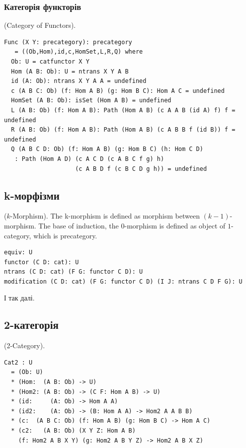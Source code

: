 \begin{definition}
\subsubsection{Категорія функторів}
\begin{definition} (Category of Functors).
\begin{lstlisting}
Func (X Y: precategory): precategory
   = ((Ob,Hom),id,c,HomSet,L,R,Q) where
  Ob: U = catfunctor X Y
  Hom (A B: Ob): U = ntrans X Y A B
  id (A: Ob): ntrans X Y A A = undefined
  c (A B C: Ob) (f: Hom A B) (g: Hom B C): Hom A C = undefined
  HomSet (A B: Ob): isSet (Hom A B) = undefined
  L (A B: Ob) (f: Hom A B): Path (Hom A B) (c A A B (id A) f) f = undefined
  R (A B: Ob) (f: Hom A B): Path (Hom A B) (c A B B f (id B)) f = undefined
  Q (A B C D: Ob) (f: Hom A B) (g: Hom B C) (h: Hom C D)
   : Path (Hom A D) (c A C D (c A B C f g) h)
                    (c A B D f (c B C D g h)) = undefined
\end{lstlisting}
\end{definition}

\subsection{k-морфізми}

\begin{definition} ($k$-Morphism).
The k-morphism is defined as morphism
between $(k-1)$-morphism. The base of induction, the $0$-morphism is
defined as object of $1$-category, which is precategory.
\begin{lstlisting}
equiv: U
functor (C D: cat): U
ntrans (C D: cat) (F G: functor C D): U
modification (C D: cat) (F G: functor C D) (I J: ntrans C D F G): U
\end{lstlisting}
І так далі.
\end{definition}

\subsection{2-категорія}
\begin{definition} (2-Category).
\begin{lstlisting}
Cat2 : U
  = (Ob: U)
  * (Hom:  (A B: Ob) -> U)
  * (Hom2: (A B: Ob) -> (C F: Hom A B) -> U)
  * (id:     (A: Ob) -> Hom A A)
  * (id2:    (A: Ob) -> (B: Hom A A) -> Hom2 A A B B)
  * (c:  (A B C: Ob) (f: Hom A B) (g: Hom B C) -> Hom A C)
  * (c2:   (A B: Ob) (X Y Z: Hom A B)
    (f: Hom2 A B X Y) (g: Hom2 A B Y Z) -> Hom2 A B X Z)
\end{lstlisting}
\end{definition}


\end{definition}
